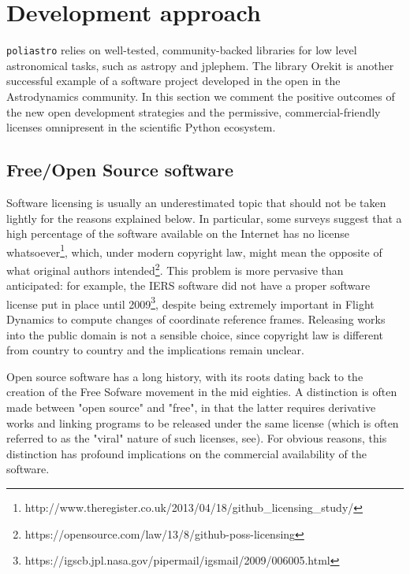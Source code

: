 \section{Development approach}
\label{sec:development}

\verb|poliastro| relies on well-tested, community-backed libraries for low level astronomical tasks, such as astropy\cite{Robitaille2013} and jplephem. The library Orekit is another successful example of a software project developed in the open in the Astrodynamics community\cite{pommier2010orekit}. In this section we comment the positive outcomes of the new open development strategies and the permissive, commercial-friendly licenses omnipresent in the scientific Python ecosystem.

\subsection{Free/Open Source software}

Software licensing is usually an underestimated topic that should not be taken lightly for the reasons explained below. In particular, some surveys suggest that a high percentage of the software available on the Internet has no license whatsoever\footnote{http://www.theregister.co.uk/2013/04/18/github\_licensing\_study/}, which, under modern copyright law, might mean the opposite of what original authors intended\footnote{https://opensource.com/law/13/8/github-poss-licensing}. This problem is more pervasive than anticipated: for example, the IERS software did not have a proper software license put in place until 2009\footnote{https://igscb.jpl.nasa.gov/pipermail/igsmail/2009/006005.html}, despite being extremely important in Flight Dynamics to compute changes of coordinate reference frames. Releasing works into the public domain is not a sensible choice, since copyright law is different from country to country and the implications remain unclear\cite{deazley2006rethinking}.

Open source software has a long history, with its roots dating back to the creation of the Free Sofware movement in the mid eighties\cite{Stallman:1985:GM}. A distinction is often made between "open source" and "free", in that the latter requires derivative works and linking programs to be released under the same license (which is often referred to as the "viral" nature of such licenses, see\cite{stallman2009viewpoint}). For obvious reasons, this distinction has profound implications on the commercial availability of the software.

